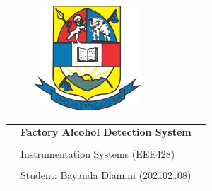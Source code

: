 \begin{center}
\vspace*{1cm}

\begin{figure}
  \raggedleft
  \begin{minipage}{4cm}
  \includegraphics[width=4cm]{images/logo1.png}
  \end{minipage}
\end{figure}

\vspace*{2cm}

\vspace*{0.1in}

\begin{spacing}{1.7}

\begin{tabular}{p{4cm} ll}

& \textbf{\large Factory Alcohol Detection System}\\ %
& \\
& \large Instrumentation Systems (EEE428) \\
& \\
& \large Student: Bayanda Dlamini (202102108)\\
\end{tabular}

\end{spacing}

\end{center}

\thispagestyle{empty} %
\clearpage\setcounter{page}{1} %
